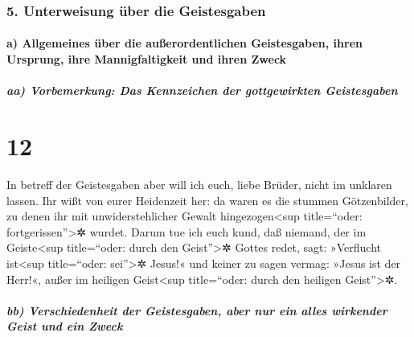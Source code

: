 \hypertarget{unterweisung-uxfcber-die-geistesgaben}{%
\subsubsection{5. Unterweisung über die
Geistesgaben}\label{unterweisung-uxfcber-die-geistesgaben}}

\hypertarget{a-allgemeines-uxfcber-die-auuxdferordentlichen-geistesgaben-ihren-ursprung-ihre-mannigfaltigkeit-und-ihren-zweck}{%
\paragraph{a) Allgemeines über die außerordentlichen Geistesgaben, ihren
Ursprung, ihre Mannigfaltigkeit und ihren
Zweck}\label{a-allgemeines-uxfcber-die-auuxdferordentlichen-geistesgaben-ihren-ursprung-ihre-mannigfaltigkeit-und-ihren-zweck}}

\hypertarget{aa-vorbemerkung-das-kennzeichen-der-gottgewirkten-geistesgaben}{%
\subparagraph{aa) Vorbemerkung: Das Kennzeichen der gottgewirkten
Geistesgaben}\label{aa-vorbemerkung-das-kennzeichen-der-gottgewirkten-geistesgaben}}

\hypertarget{section-11}{%
\section{12}\label{section-11}}

 In betreff der Geistesgaben aber will ich euch, liebe
Brüder, nicht im unklaren lassen.  Ihr wißt von eurer
Heidenzeit her: da waren es die stummen Götzenbilder, zu denen ihr mit
unwiderstehlicher Gewalt hingezogen\textless sup title=``oder:
fortgerissen''\textgreater✲ wurdet.  Darum tue ich euch
kund, daß niemand, der im Geiste\textless sup title=``oder: durch den
Geist''\textgreater✲ Gottes redet, sagt: »Verflucht ist\textless sup
title=``oder: sei''\textgreater✲ Jesus!« und keiner zu sagen vermag:
»Jesus ist der Herr!«, außer im heiligen Geist\textless sup
title=``oder: durch den heiligen Geist''\textgreater✲.

\hypertarget{bb-verschiedenheit-der-geistesgaben-aber-nur-ein-alles-wirkender-geist-und-ein-zweck}{%
\subparagraph{bb) Verschiedenheit der Geistesgaben, aber nur ein alles
wirkender Geist und ein
Zweck}\label{bb-verschiedenheit-der-geistesgaben-aber-nur-ein-alles-wirkender-geist-und-ein-zweck}}

